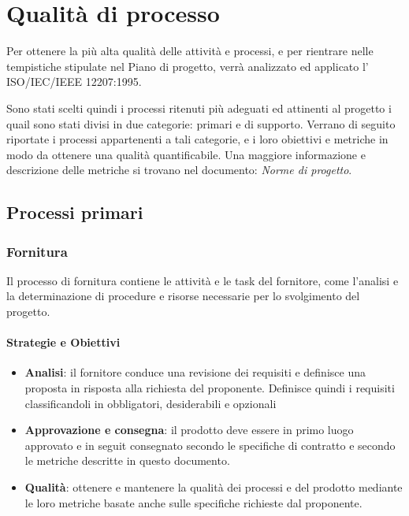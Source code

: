 \section{Qualità di processo}
Per ottenere la più alta qualità delle attività e processi, e per rientrare nelle tempistiche stipulate nel Piano di progetto, verrà analizzato ed applicato l' ISO/IEC/IEEE 12207:1995.

Sono stati scelti quindi i processi ritenuti più adeguati ed attinenti al progetto i quail sono stati divisi in due categorie: primari e di supporto. Verrano di seguito riportate i processi appartenenti a tali categorie, e i loro obiettivi e metriche in modo da ottenere una qualità quantificabile.
Una maggiore informazione e descrizione delle metriche si trovano nel documento: \textit{Norme di progetto}.

    \subsection{Processi primari}
    
    
        \subsubsection{Fornitura}
        Il processo di fornitura contiene le attività e le task del fornitore, come l'analisi e la determinazione di procedure e risorse necessarie per lo svolgimento del progetto.
        
            \paragraph{Strategie e Obiettivi}
            \begin{itemize}
                \item \textbf{Analisi}: il fornitore conduce una revisione dei requisiti e definisce una proposta in risposta alla richiesta del proponente. Definisce quindi i requisiti classificandoli in obbligatori, desiderabili e opzionali
                \item \textbf{Approvazione e consegna}: il prodotto deve essere in primo luogo approvato e in seguit consegnato secondo le specifiche di contratto e secondo le metriche descritte in questo documento.
                \item \textbf{Qualità}: ottenere e mantenere la qualità dei processi e del prodotto mediante le loro metriche basate anche sulle specifiche richieste dal proponente.
            \end{itemize}
            
